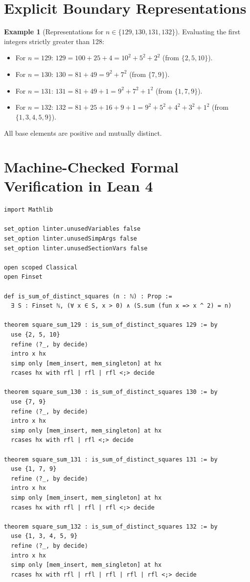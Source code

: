 \documentclass[11pt,a4paper]{article}
\theoremstyle{definition}
\newtheorem{example}[theorem]{Example}
\begin{document}
\section{Explicit Boundary Representations}

\begin{example}[Representations for $n \in \{129, 130, 131, 132\}$]\label{ex:boundary_reps}
Evaluating the first integers strictly greater than 128:
\begin{itemize}
    \item For $n = 129$: $129 = 100 + 25 + 4 = 10^2 + 5^2 + 2^2$ (from $\{2, 5, 10\}$).
    \item For $n = 130$: $130 = 81 + 49 = 9^2 + 7^2$ (from $\{7, 9\}$).
    \item For $n = 131$: $131 = 81 + 49 + 1 = 9^2 + 7^2 + 1^2$ (from $\{1, 7, 9\}$).
    \item For $n = 132$: $132 = 81 + 25 + 16 + 9 + 1 = 9^2 + 5^2 + 4^2 + 3^2 + 1^2$ (from $\{1, 3, 4, 5, 9\}$).
\end{itemize}
All base elements are positive and mutually distinct.
\end{example}

\section{Machine-Checked Formal Verification in Lean 4}

\begin{lstlisting}[caption={Formal Lean 4 Implementation of Distinct Square Sums}]
import Mathlib

set_option linter.unusedVariables false
set_option linter.unusedSimpArgs false
set_option linter.unusedSectionVars false

open scoped Classical
open Finset

def is_sum_of_distinct_squares (n : ℕ) : Prop :=
  ∃ S : Finset ℕ, (∀ x ∈ S, x > 0) ∧ (S.sum (fun x => x ^ 2) = n)

theorem square_sum_129 : is_sum_of_distinct_squares 129 := by
  use {2, 5, 10}
  refine ⟨?_, by decide⟩
  intro x hx
  simp only [mem_insert, mem_singleton] at hx
  rcases hx with rfl | rfl | rfl <;> decide

theorem square_sum_130 : is_sum_of_distinct_squares 130 := by
  use {7, 9}
  refine ⟨?_, by decide⟩
  intro x hx
  simp only [mem_insert, mem_singleton] at hx
  rcases hx with rfl | rfl <;> decide

theorem square_sum_131 : is_sum_of_distinct_squares 131 := by
  use {1, 7, 9}
  refine ⟨?_, by decide⟩
  intro x hx
  simp only [mem_insert, mem_singleton] at hx
  rcases hx with rfl | rfl | rfl <;> decide

theorem square_sum_132 : is_sum_of_distinct_squares 132 := by
  use {1, 3, 4, 5, 9}
  refine ⟨?_, by decide⟩
  intro x hx
  simp only [mem_insert, mem_singleton] at hx
  rcases hx with rfl | rfl | rfl | rfl | rfl <;> decide
\end{lstlisting}
\end{document}
